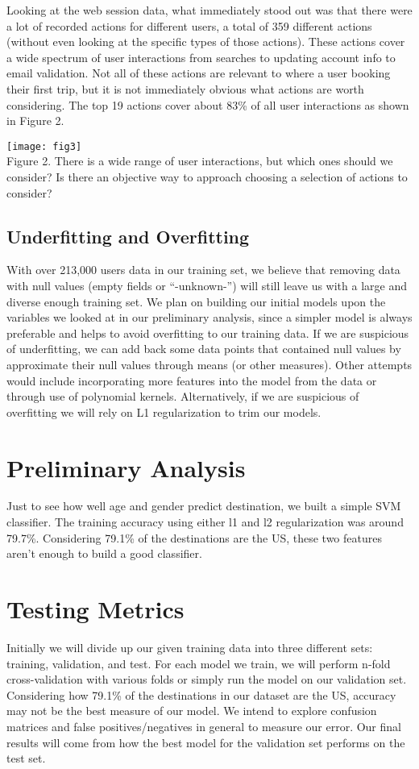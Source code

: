 \documentclass[a4paper, 11pt]{article}
\begin{document}
\par
Looking at the web session data, what immediately stood out was that there were a lot of recorded actions for different users, a total of 359 different actions (without even looking at the specific types of those actions). These actions cover a wide spectrum of user interactions from searches to updating account info to email validation. Not all of these actions are relevant to where a user booking their first trip, but it is not immediately obvious what actions are worth considering. The top 19 actions cover about 83\% of all user interactions as shown in Figure 2.
\begin{center}
\texttt{[image: fig3]} \\
Figure 2. There is a wide range of user interactions, but which ones should we consider? Is there an objective way to approach choosing a selection of actions to consider?
\end{center}

\subsection*{Underfitting and Overfitting}
\par
With over 213,000 users data in our training set, we believe that removing data with null values (empty fields or “-unknown-”) will still leave us with a large and diverse enough training set. We plan on building our initial models upon the variables we looked at in our preliminary analysis, since a simpler model is always preferable and helps to avoid overfitting to our training data. 
If we are suspicious of underfitting, we can add back some data points that contained null values by approximate their null values through means (or other measures). Other attempts would include incorporating more features into the model from the data or through use of polynomial kernels. Alternatively, if we are suspicious of overfitting we will rely on L1 regularization to trim our models.
\section*{Preliminary Analysis}
\par
    Just to see how well age and gender predict destination, we built a simple SVM classifier. The training accuracy using either l1 and l2 regularization was around 79.7\%. Considering 79.1\% of the destinations are the US, these two features aren’t enough to build a good classifier.
\section*{Testing Metrics}
\par
    Initially we will divide up our given training data into three different sets: training, validation, and test. For each model we train, we will perform n-fold cross-validation with various folds or simply run the model on our validation set. Considering how 79.1\% of the destinations in our dataset are the US, accuracy may not be the best measure of our model. We intend to explore confusion matrices and false positives/negatives in general to measure our error. Our final results will come from how the best model for the validation set performs on the test set.
\end{document}
